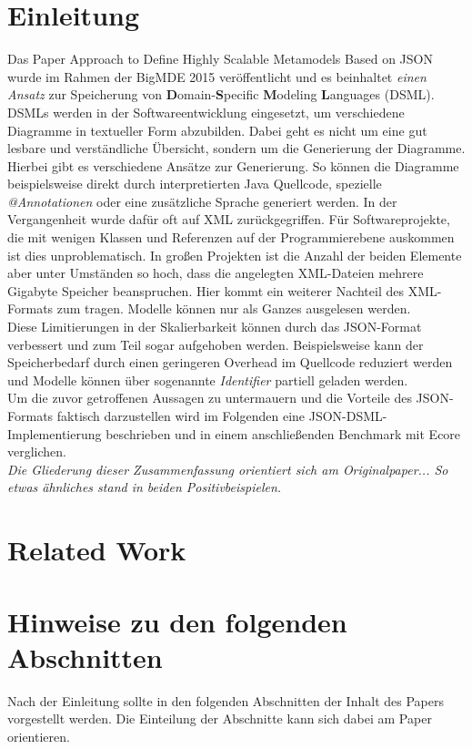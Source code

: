\documentclass[ngerman]{ewks-latex}
\begin{document}
\section{Einleitung}
Das Paper Approach to Define Highly Scalable Metamodels Based on JSON \cite{gerhart2015approach} wurde im Rahmen der BigMDE 2015 veröffentlicht und es beinhaltet \textit{einen Ansatz} zur Speicherung von \textbf{D}omain-\textbf{S}pecific \textbf{M}odeling \textbf{L}anguages (DSML). DSMLs werden in der Softwareentwicklung eingesetzt, um verschiedene Diagramme in textueller Form abzubilden. Dabei geht es nicht um eine gut lesbare und verständliche Übersicht, sondern um die Generierung der Diagramme. Hierbei gibt es verschiedene Ansätze zur Generierung. So können die Diagramme beispielsweise direkt durch interpretierten Java Quellcode, spezielle \textit{@Annotationen} oder eine zusätzliche Sprache generiert werden\cite{france2005domain}. In der Vergangenheit wurde dafür oft auf XML zurückgegriffen. Für Softwareprojekte, die mit wenigen Klassen und Referenzen auf der Programmierebene auskommen ist dies unproblematisch. In großen Projekten ist die Anzahl der beiden Elemente aber unter Umständen so hoch, dass die angelegten XML-Dateien mehrere Gigabyte Speicher beanspruchen. Hier kommt ein weiterer Nachteil des XML-Formats zum tragen. Modelle können nur als Ganzes ausgelesen werden. \\
Diese Limitierungen in der Skalierbarkeit können durch das JSON-Format verbessert und zum Teil sogar aufgehoben werden. Beispielsweise kann der Speicherbedarf durch einen geringeren Overhead im Quellcode reduziert werden und Modelle können über sogenannte \textit{Identifier} partiell geladen werden. \\
Um die zuvor getroffenen Aussagen zu untermauern und die Vorteile des JSON-Formats faktisch darzustellen wird im Folgenden eine JSON-DSML-Implementierung beschrieben und in einem anschließenden Benchmark mit Ecore verglichen. \\
\textit{Die Gliederung dieser Zusammenfassung orientiert sich am Originalpaper... \glqq So etwas ähnliches stand in beiden Positivbeispielen.\grqq} 
\section{Related Work}


\section{Hinweise zu den folgenden Abschnitten}
Nach der Einleitung sollte in den folgenden Abschnitten der Inhalt des Papers vorgestellt werden. Die Einteilung der Abschnitte kann sich dabei am Paper orientieren.
\end{document}
